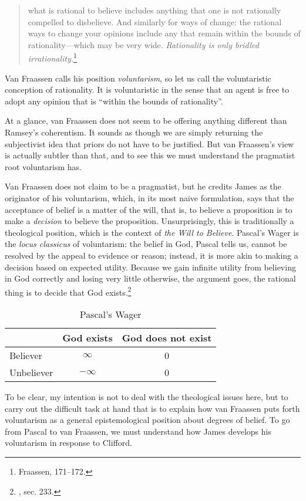 \begin{quote}
what is rational to believe includes anything that one is not rationally
compelled to disbelieve. And similarly for ways of change: the rational
ways to change your opinions include any that remain within the bounds
of rationality---which may be very wide. \emph{Rationality is only
bridled irrationality.}\footnote{Fraassen, 171--172.}
\end{quote}

Van Fraassen calls his position \emph{voluntarism}, so let us call the
voluntaristic conception of rationality. It is voluntaristic in the
sense that an agent is free to adopt any opinion that is ``within the
bounds of rationality''.

At a glance, van Fraassen does not seem to be offering anything
different than Ramsey's coherentism. It sounds as though we are simply
returning the subjectivist idea that priors do not have to be justified.
But van Fraassen's view is actually subtler than that, and to see this
we must understand the pragmatist root voluntarism has.

Van Fraassen does not claim to be a pragmatist, but he credits James as
the originator of his voluntarism, which, in its most naive formulation,
says that the acceptance of belief is a matter of the will, that is, to
believe a proposition is to make a \emph{decision} to believe the
proposition. Unsurprisingly, this is traditionally a theological
position, which is the context of \emph{the Will to Believe}. Pascal's
Wager is the \emph{locus classicus} of voluntarism: the belief in God,
Pascal tells us, cannot be resolved by the appeal to evidence or reason;
instead, it is more akin to making a decision based on expected utility.
Because we gain infinite utility from believing in God correctly and
losing very little otherwise, the argument goes, the rational thing is
to decide that God exists.\footnote{\cite{pascal}, sec. 233.}

	\begin{table}[h]
	\centering
  \begin{tabular}{l|cc}
    & God exists& God does not exist\\
    \hline
    Believer& $\infty$  & 0\\
    Unbeliever&$-\infty$ &0
  \end{tabular}
  \caption{Pascal's Wager}
  \label{pascalswager}
\end{table}

To be clear, my intention is not to deal with the theological issues
here, but to carry out the difficult task at hand that is to explain how van Fraassen puts forth voluntarism as a general epistemological position about
degrees of belief. To go from Pascal to van Fraassen, we must understand
how James develops his voluntarism in response to Clifford.

